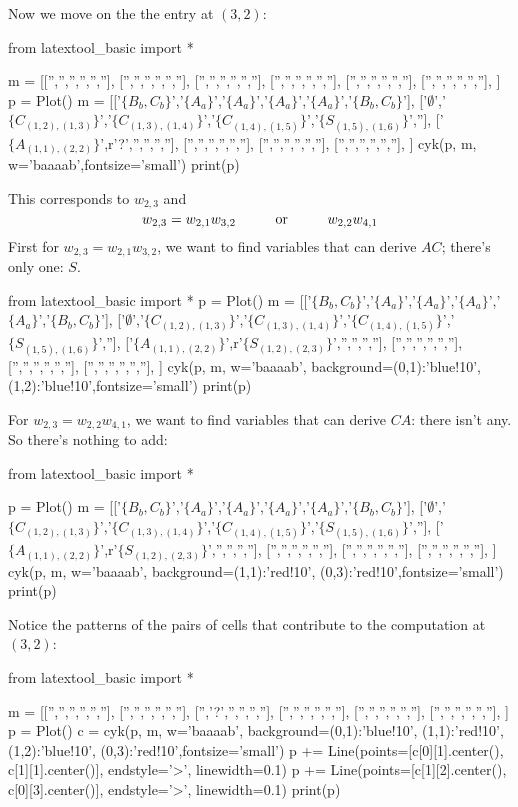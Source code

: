 Now we move on the the entry at $(3,2)$:
\begin{python}
from latextool_basic import *

m = [['','','','','',''],
     ['','','','','',''],
     ['','','','','',''],
     ['','','','','',''],
     ['','','','','',''],
     ['','','','','',''],
     ]
p = Plot()
m = [['$\{B_b,C_b\}$','$\{A_a\}$','$\{A_a\}$','$\{A_a\}$','$\{A_a\}$','$\{B_b,C_b\}$'],
     ['$\emptyset$','$\{C_{(1,2),(1,3)}\}$','$\{C_{(1,3),(1,4)}\}$','$\{C_{(1,4),(1,5)}\}$','$\{S_{(1,5),(1,6)}\}$',''],
     ['$\{A_{(1,1),(2,2)}\}$',r'?','','','',''],
     ['','','','','',''],
     ['','','','','',''],
     ['','','','','',''],
     ]
cyk(p, m, w='baaaab',fontsize='small')
print(p)
\end{python}

This corresponds to $w_{2,3}$ and
\[
w_{2,3} = w_{2,1}w_{3,2} \hskip 1cm \text{or} \hskip 1cm w_{2,2}w_{4,1}
\] 
First for $w_{2,3} = w_{2,1}w_{3,2}$, we want to find variables that can derive
$AC$; there's only one: $S$.
\begin{python}
from latextool_basic import *
p = Plot()
m = [['$\{B_b,C_b\}$','$\{A_a\}$','$\{A_a\}$','$\{A_a\}$','$\{A_a\}$','$\{B_b,C_b\}$'],
     ['$\emptyset$','$\{C_{(1,2),(1,3)}\}$','$\{C_{(1,3),(1,4)}\}$','$\{C_{(1,4),(1,5)}\}$','$\{S_{(1,5),(1,6)}\}$',''],
     ['$\{A_{(1,1),(2,2)}\}$',r'$\{S_{(1,2),(2,3)}\}$','','','',''],
     ['','','','','',''],
     ['','','','','',''],
     ['','','','','',''],
     ]
cyk(p, m, w='baaaab', background={(0,1):'blue!10', (1,2):'blue!10'},fontsize='small')
print(p)
\end{python}

For $w_{2,3} = w_{2,2}w_{4,1}$, we want to find variables 
that can derive $CA$: there isn't any.
So there's nothing to add:
\begin{python}
from latextool_basic import *

p = Plot()
m = [['$\{B_b,C_b\}$','$\{A_a\}$','$\{A_a\}$','$\{A_a\}$','$\{A_a\}$','$\{B_b,C_b\}$'],
     ['$\emptyset$','$\{C_{(1,2),(1,3)}\}$','$\{C_{(1,3),(1,4)}\}$','$\{C_{(1,4),(1,5)}\}$','$\{S_{(1,5),(1,6)}\}$',''],
     ['$\{A_{(1,1),(2,2)}\}$',r'$\{S_{(1,2),(2,3)}\}$','','','',''],
     ['','','','','',''],
     ['','','','','',''],
     ['','','','','',''],
     ]
cyk(p, m, w='baaaab', background={(1,1):'red!10', (0,3):'red!10'},fontsize='small')
print(p)
\end{python}

Notice the patterns of the pairs of cells that contribute to the 
computation at $(3,2)$:
\begin{python}
from latextool_basic import *

m = [['','','','','',''],
     ['','','','','',''],
     ['','?','','','',''],
     ['','','','','',''],
     ['','','','','',''],
     ['','','','','',''],
     ]
p = Plot()
c = cyk(p, m, w='baaaab', background={(0,1):'blue!10', (1,1):'red!10', (1,2):'blue!10', (0,3):'red!10'},fontsize='small')
p += Line(points=[c[0][1].center(), c[1][1].center()], endstyle='>', linewidth=0.1)
p += Line(points=[c[1][2].center(), c[0][3].center()], endstyle='>', linewidth=0.1)
print(p)
\end{python}

